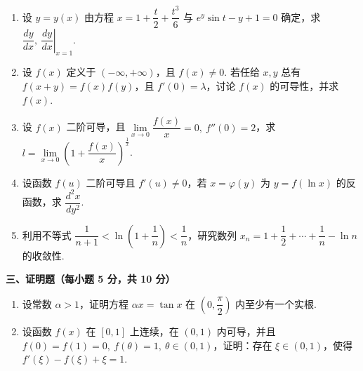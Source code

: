 \documentclass[a4paper,11pt]{ctexart}
\begin{document}
\begin{enumerate}[label=\arabic*., start=11, leftmargin=2em, itemsep=1.05em, topsep=0.5em]
  \item 设 $y = y(x)$ 由方程 $x = 1 + \dfrac{t}{2} + \dfrac{t^3}{6}$ 与 $e^y\sin t - y + 1 = 0$ 确定，求 $\dfrac{dy}{dx},\ \left.\dfrac{dy}{dx}\right|_{x=1}$.

  \item 设 $f(x)$ 定义于 $(-\infty,+\infty)$，且 $f(x)\neq 0$. 若任给 $x,y$ 总有 $f(x+y)=f(x)f(y)$，且 $f'(0)=\lambda$，讨论 $f(x)$ 的可导性，并求 $f(x)$.

  \item 设 $f(x)$ 二阶可导，且 $\lim\limits_{x\to 0}\dfrac{f(x)}{x}=0,\ f''(0)=2$，求 $l = \lim\limits_{x\to 0}\left(1+\dfrac{f(x)}{x}\right)^{\frac{1}{x}}$.

  \item 设函数 $f(u)$ 二阶可导且 $f'(u)\neq 0$，若 $x=\varphi(y)$ 为 $y=f(\ln x)$ 的反函数，求 $\dfrac{d^2x}{dy^2}$.

  \item 利用不等式 $\dfrac{1}{n+1} < \ln\left(1+\dfrac{1}{n}\right) < \dfrac{1}{n}$，研究数列 $x_n = 1+\dfrac{1}{2}+\cdots+\dfrac{1}{n}-\ln n$ 的收敛性.
\end{enumerate}

\vspace{1.0em}
\textbf{三、证明题（每小题 5 分，共 10 分）}

\begin{enumerate}[label=\arabic*., start=16, leftmargin=2em, itemsep=1.05em, topsep=0.5em]
  \item 设常数 $\alpha > 1$，证明方程 $\alpha x = \tan x$ 在 $\left(0,\dfrac{\pi}{2}\right)$ 内至少有一个实根.

  \item 设函数 $f(x)$ 在 $[0,1]$ 上连续，在 $(0,1)$ 内可导，并且 $f(0)=f(1)=0,\ f(\theta)=1,\ \theta\in(0,1)$，证明：存在 $\xi\in(0,1)$，使得 $f'(\xi)-f(\xi)+\xi=1$.
\end{enumerate}
\end{document}
